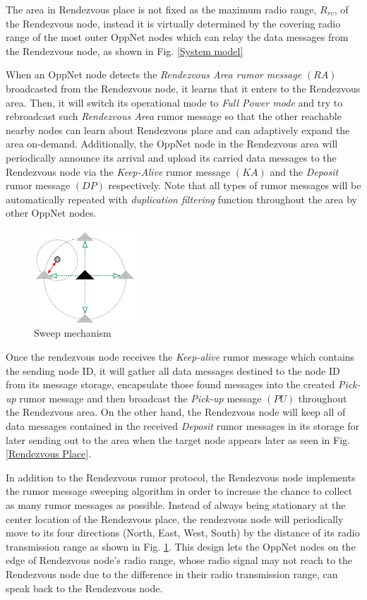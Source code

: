 The area in Rendezvous place is not fixed as the maximum radio range, $R_{rv}$,  of the Rendezvous node, instead it is virtually determined by the covering radio range of the most outer OppNet nodes which can relay the data messages from the Rendezvous node, as shown in Fig. \ref{System model}

When an OppNet node detects the \emph{Rendezvous Area rumor message} $(RA)$ broadcasted from the Rendezvous node, it learns that it enters to the Rendezvous area.
Then, it will switch its operational mode to \emph{Full Power mode} and try to rebroadcast such \emph{Rendezvous Area }rumor message so that the other reachable nearby nodes can learn about Rendezvous place and can adaptively expand the area on-demand.
Additionally, the OppNet node in the Rendezvous area will periodically announce its arrival and upload its carried data messages to the Rendezvous node via the \emph{Keep-Alive} rumor message $(KA)$ and the \emph{Deposit} rumor message $(DP)$ respectively.
Note that all types of rumor messages will be automatically repeated with \emph{duplication filtering} function throughout the area by other OppNet nodes.


\begin{figure}[!t]
\centering
\includegraphics[width=1.5in]{Figures/Sweep.pdf}
\caption{Sweep mechanism}
\label{Sweep mechanism}
\end{figure}

Once the rendezvous node receives the \emph{Keep-alive} rumor message which contains the sending node ID, it will gather all data messages destined to the node ID from its message storage, encapsulate those found messages into the created \emph{Pick-up} rumor message and then broadcast the \emph{Pick-up} message $(PU)$ throughout the Rendezvous area.
On the other hand, the Rendezvous node will keep all of data messages contained in the received \emph{Deposit} rumor messages in its storage for later sending out to the area when the target node appears later as seen in Fig. \ref{Rendezvous Place}. 

In addition to the Rendezvous rumor protocol, the Rendezvous node implements the rumor message sweeping algorithm in order to increase the chance to collect as many rumor messages as possible.
Instead of always being stationary at the center location of the Rendezvous place, the rendezvous node will periodically move to its four directions (North, East, West, South) by the distance of its radio transmission range as shown in Fig. \ref{Sweep mechanism}.
This design lets the OppNet nodes on the edge of Rendezvous node's radio range, whose radio signal may not reach to the Rendezvous node due to the difference in their radio transmission range, can speak back to the Rendezvous node.



